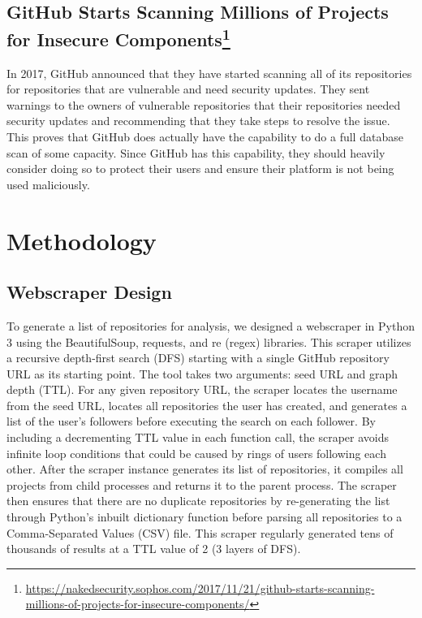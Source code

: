 \documentclass[]{acmart}
\begin{document}
\subsection[GitHub Starts Scanning Millions of Projects for Insecure Components]{GitHub Starts Scanning Millions of Projects for Insecure Components\footnote{\url{https://nakedsecurity.sophos.com/2017/11/21/github-starts-scanning-millions-of-projects-for-insecure-components/}}}
In 2017, GitHub announced that they have started scanning all of its repositories for repositories that are vulnerable and need security updates. They sent warnings to the owners of vulnerable repositories that their repositories needed security updates and recommending that they take steps to resolve the issue. This proves that GitHub does actually have the capability to do a full database scan of some capacity. Since GitHub has this capability, they should heavily consider doing so to protect their users and ensure their platform is not being used maliciously.
\section{Methodology}
\subsection{Webscraper Design}
To generate a list of repositories for analysis, we designed a webscraper in Python 3 using the BeautifulSoup, requests, and re (regex) libraries. This scraper utilizes a recursive depth-first search (DFS) starting with a single GitHub repository URL as its starting point. The tool takes two arguments: seed URL and graph depth (TTL). For any given repository URL, the scraper locates the username from the seed URL, locates all repositories the user has created, and generates a list of the user's followers before executing the search on each follower. By including a decrementing TTL value in each function call, the scraper avoids infinite loop conditions that could be caused by rings of users following each other. After the scraper instance generates its list of repositories, it compiles all projects from child processes and returns it to the parent process. The scraper then ensures that there are no duplicate repositories by re-generating the list through Python's inbuilt dictionary function before parsing all repositories to a Comma-Separated Values (CSV) file. This scraper regularly generated tens of thousands of results at a TTL value of 2 (3 layers of DFS).
\end{document}
